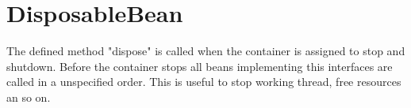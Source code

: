 \section{DisposableBean}
\label{feature:DisposableBean}
\ClearAPI
The defined method "dispose" is called when the container is assigned to stop and shutdown. Before the container stops all beans implementing this interfaces are called in a unspecified order. This is useful to stop working thread, free resources an so on.